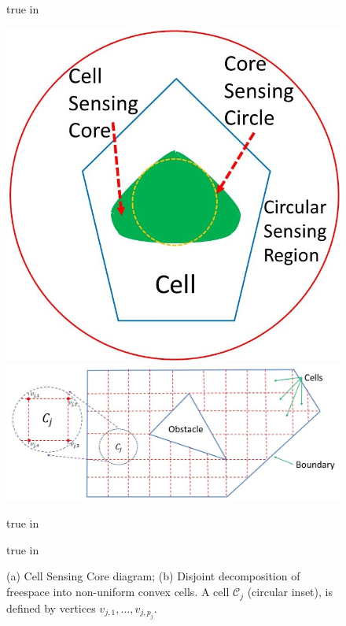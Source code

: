 \documentclass[letterpaper, 10 pt, conference]{ieeeconf}
\theoremstyle{definition}
\begin{document}
\begin{figure}
   true in
  \centerline{
  \includegraphics[height=1.0 true in]{CellSensingCore.jpg}
  \includegraphics[height=1.0 true in]{FreespaceDivision.jpg}
  }
       true in
  \caption{(a) Cell Sensing Core diagram; (b) Disjoint decomposition of freespace into non-uniform convex cells.  A cell $\mathcal{C}_j$ (circular inset), is defined by vertices $v_{j,1},\ldots,v_{j,p_j}$.}
  \label{fig:completecoverage}
     true in
\end{figure}
\end{document}
